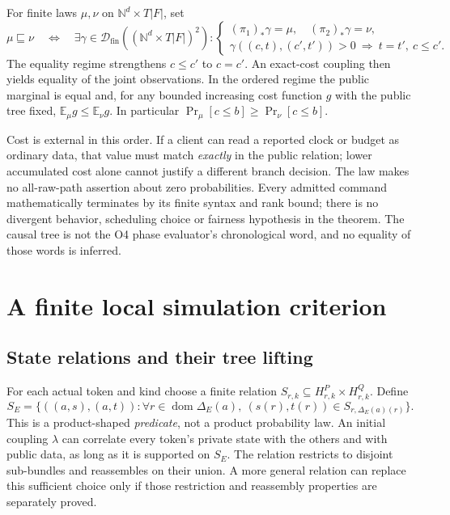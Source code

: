 \documentclass[11pt,a4paper]{article}
\theoremstyle{definition}
\newcommand{\Dfin}{\mathcal D_{\mathrm{fin}}}
\begin{document}
For finite laws $\mu,\nu$ on $\mathbb N^d\times T|F|$, set
\begin{equation}\label{eq:obsorder}
 \mu\sqsubseteq\nu
 \quad\Longleftrightarrow\quad
 \exists\gamma\in\Dfin((\mathbb N^d\times T|F|)^2):
 \begin{cases}
  (\pi_1)_*\gamma=\mu,\quad(\pi_2)_*\gamma=\nu,\\
  \gamma((c,t),(c',t'))>0\ \Longrightarrow\ t=t',\ c\le c'.
 \end{cases}
\end{equation}
The equality regime strengthens $c\le c'$ to $c=c'$. An exact-cost
coupling then yields equality of the joint observations. In the ordered
regime the public marginal is equal and, for any bounded increasing cost
function $g$ with the public tree fixed,
$\mathbb E_\mu g\le\mathbb E_\nu g$. In particular
$\Pr_\mu[c\le b]\ge\Pr_\nu[c\le b]$.

Cost is external in this order. If a client can read a reported clock or
budget as ordinary data, that value must match \emph{exactly} in the
public relation; lower accumulated cost alone cannot justify a different
branch decision. The law makes no all-raw-path assertion about zero
probabilities. Every admitted command mathematically terminates by its
finite syntax and rank bound; there is no divergent behavior, scheduling
choice or fairness hypothesis in the theorem. The causal tree is not the
O4 phase evaluator's chronological word, and no equality of those words
is inferred.

\section{A finite local simulation criterion}\label{sec:criterion}

\subsection{State relations and their tree lifting}
For each actual token and kind choose a finite relation
$S_{r,k}\subseteq H^P_{r,k}\times H^Q_{r,k}$. Define
\begin{equation}\label{eq:state-relation}
 S_E=\{((a,s),(a,t)):\forall r\in\operatorname{dom}\Delta_E(a),
                     \ (s(r),t(r))\in S_{r,\Delta_E(a)(r)}\}.
\end{equation}
This is a product-shaped \emph{predicate}, not a product probability law.
An initial coupling $\lambda$ can correlate every token's private state
with the others and with public data, as long as it is supported on $S_E$.
The relation restricts to disjoint sub-bundles and reassembles on their
union. A more general relation can replace this sufficient choice only
if those restriction and reassembly properties are separately proved.
\end{document}
